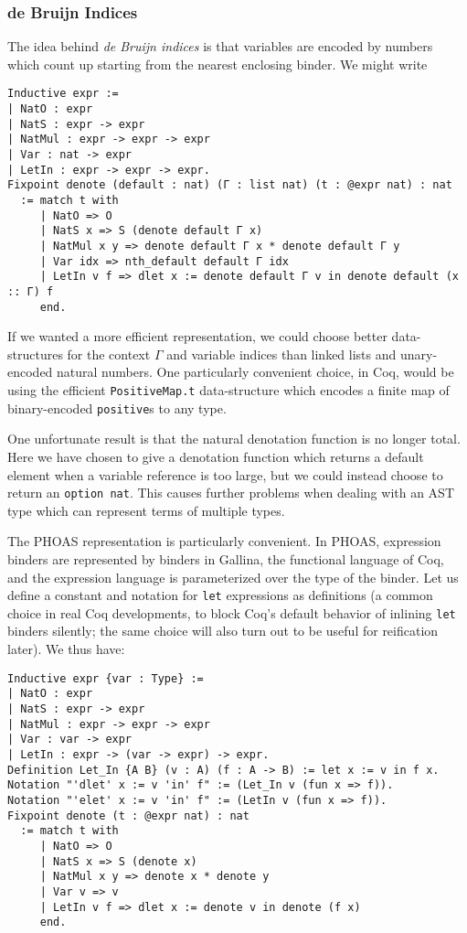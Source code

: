 \subsubsection{de Bruijn Indices} \label{sec:binders:de-bruijn}
The idea behind \emph{de Bruijn indices} is that variables are encoded by numbers which count up starting from the nearest enclosing binder.
We might write
\begin{verbatim}
Inductive expr :=
| NatO : expr
| NatS : expr -> expr
| NatMul : expr -> expr -> expr
| Var : nat -> expr
| LetIn : expr -> expr -> expr.
Fixpoint denote (default : nat) (Γ : list nat) (t : @expr nat) : nat
  := match t with
     | NatO => O
     | NatS x => S (denote default Γ x)
     | NatMul x y => denote default Γ x * denote default Γ y
     | Var idx => nth_default default Γ idx
     | LetIn v f => dlet x := denote default Γ v in denote default (x :: Γ) f
     end.
\end{verbatim}
If we wanted a more efficient representation, we could choose better data-structures for the context $\Gamma$ and variable indices than linked lists and unary-encoded natural numbers.
One particularly convenient choice, in Coq, would be using the efficient \texttt{PositiveMap.t} data-structure which encodes a finite map of binary-encoded \texttt{positive}s to any type.

One unfortunate result is that the natural denotation function is no longer total.
Here we have chosen to give a denotation function which returns a default element when a variable reference is too large, but we could instead choose to return an \texttt{option nat}.
This causes further problems when dealing with an AST type which can represent terms of multiple types.




The PHOAS representation is particularly convenient.
In PHOAS, expression binders are represented by binders in Gallina, the functional language of Coq, and the expression language is parameterized over the type of the binder.
Let us define a constant and notation for \texttt{let} expressions as definitions (a common choice in real Coq developments, to block Coq's default behavior of inlining \texttt{let} binders silently; the same choice will also turn out to be useful for reification later).
We thus have: \label{sec:phoas-expr-def}
\begin{verbatim}
Inductive expr {var : Type} :=
| NatO : expr
| NatS : expr -> expr
| NatMul : expr -> expr -> expr
| Var : var -> expr
| LetIn : expr -> (var -> expr) -> expr.
Definition Let_In {A B} (v : A) (f : A -> B) := let x := v in f x.
Notation "'dlet' x := v 'in' f" := (Let_In v (fun x => f)).
Notation "'elet' x := v 'in' f" := (LetIn v (fun x => f)).
Fixpoint denote (t : @expr nat) : nat
  := match t with
     | NatO => O
     | NatS x => S (denote x)
     | NatMul x y => denote x * denote y
     | Var v => v
     | LetIn v f => dlet x := denote v in denote (f x)
     end.
\end{verbatim}

